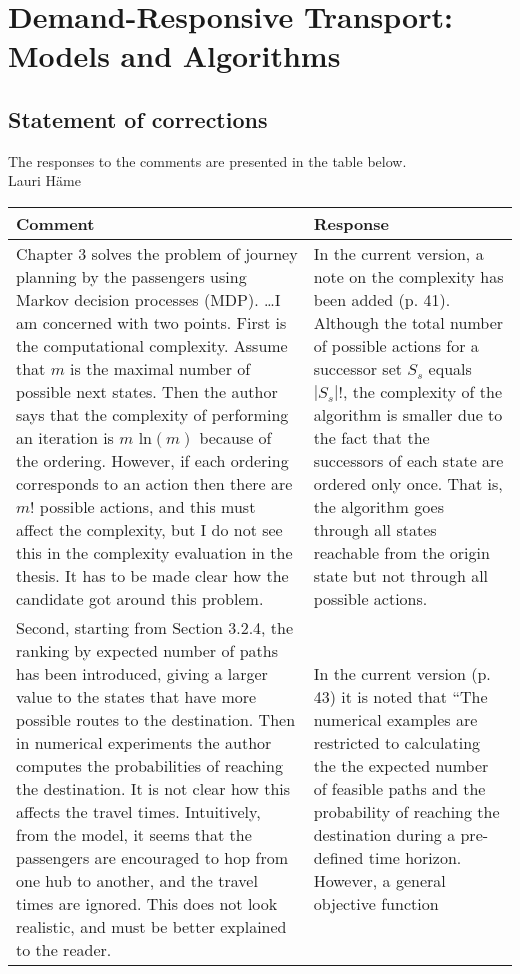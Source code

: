 \documentclass[a4paper,12pt]{article}
\begin{document}
\section*{Demand-Responsive Transport: Models and Algorithms}
\subsection*{Statement of corrections}
The responses to the comments are presented in the table below. \\
Lauri H\"ame

\begin{longtable}{|p{}|p{}|}
\hline
Comment & Response \\ \hline
Chapter 3 solves the problem of journey planning by the passengers using Markov decision
processes (MDP). \ldots I am concerned with two points. First
is the computational complexity. Assume that $m$ is the maximal number of possible next states.
Then the author says that the complexity of performing an iteration is $m$ ln$(m)$ because of the
ordering. However, if each ordering corresponds to an action then there are $m!$ possible actions,
and this must affect the complexity, but I do not see this in the complexity evaluation in the
thesis. It has to be made clear how the candidate got around this problem. 
& 
In the current version, a note on the complexity has been added (p. 41). Although the total number of 
possible actions for a successor set $S_s$ equals $|S_s|!$, the complexity of the algorithm is smaller due to the fact that 
the successors of each state are ordered only once. That is, the algorithm goes through all states reachable from the origin state 
but not through all possible actions. 
\\ \hline
Second, starting from
Section 3.2.4, the ranking by expected number of paths has been introduced, giving a larger value
to the states that have more possible routes to the destination. Then in numerical experiments
the author computes the probabilities of reaching the destination. It is not clear how this affects
the travel times. Intuitively, from the model, it seems that the passengers are encouraged to hop
from one hub to another, and the travel times are ignored. This does not look realistic, and must
be better explained to the reader. 
& 
In the current version (p. 43) it is noted that ``The numerical examples are restricted to calculating the the expected number of feasible paths and 
the probability of reaching the destination during a pre-defined time horizon. However, a general objective function

\end{longtable}
\end{document}
